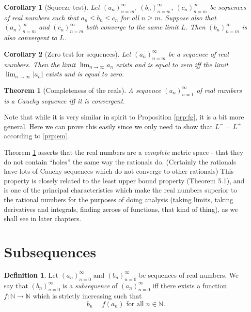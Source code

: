 \documentclass[
]{book}
\newtheorem{theorem}{Theorem}[chapter]
\newtheorem{corollary}{Corollary}[chapter]
\theoremstyle{definition}
\newtheorem{definition}{Definition}[chapter]
\theoremstyle{definition}
\theoremstyle{definition}
\theoremstyle{definition}
\theoremstyle{remark}
\begin{document}
\begin{corollary}[Squeeze test]
Let \((a_n)_{n=m}^{\infty}\), \((b_n)_{n=m}^{\infty}\), \((c_n)_{n=m}^{\infty}\) be sequences of real numbers such that \(a_n\leq b_n\leq c_n\) for all \(n\geq m\). Suppose also that \((a_n)_{n=m}^{\infty}\) and \((c_n)_{n=m}^{\infty}\) both converge to the same limit \(L\). Then \((b_n)_{n=m}^{\infty}\) is also convergent to \(L\).
\end{corollary}

\begin{corollary}[Zero test for sequences]
Let \((a_n)_{n=m}^{\infty}\) be a sequence of real numbers. Then the limit \(\lim_{n\to\infty}a_n\) exists and is equal to zero iff the limit \(\lim_{n\to \infty}|a_n|\) exists and is equal to zero.
\end{corollary}

\begin{theorem}[Completeness of the reals]
\protect\hypertarget{thm:c}{}\label{thm:c}A sequence \((a_n)_{n=1}^{\infty}\) of real numbers is a Cauchy sequence iff it is convergent.
\end{theorem}

Note that while it is very similar in spirit to Proposition \ref{prp:fg}, it is a bit more general. Here we can prove this easily since we only need to show that \(L^-=L^+\) according to \ref{prp:em}.

Theorem \ref{thm:c} asserts that the real numbers are a \emph{complete} metric space - that they do not contain ``holes'' the same way the rationals do. (Certainly the rationals have lots of Cauchy sequences which do not converge to other rationals) This property is closely related to the least upper bound property (Theorem 5.1), and is one of the principal characteristics which make the real numbers superior to the rational numbers for the purposes of doing analysis (taking limits, taking derivatives and integrals, finding zeroes of functions, that kind of thing), as we shall see in later chapters.

\section{Subsequences}\label{subsequences}

\begin{definition}
Let \((a_n)_{n=0}^{\infty}\) and \((b_n)_{n=0}^{\infty}\) be sequences of real numbers. We say that \((b_n)_{n=0}^{\infty}\) is a \emph{subsequence} of \((a_n)_{n=0}^{\infty}\) iff there exists a function \(f:\mathbb{N}\to\mathbb{N}\) which is strictly increasing such that
\[
b_n=f(a_n) \text{ for all } n\in\mathbb{N}.
\]
\end{definition}
\end{document}

